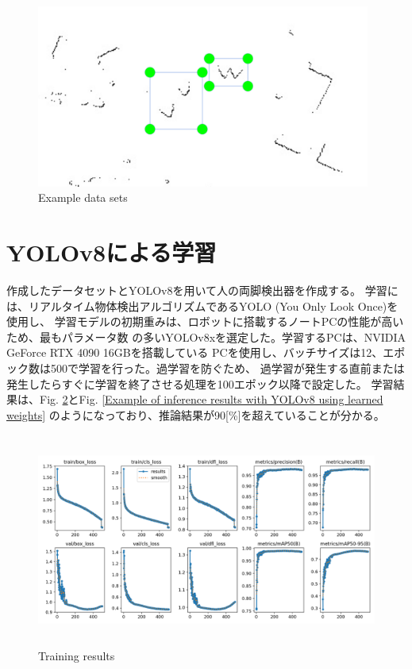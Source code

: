 \begin{figure}[h]
    \begin{center}
    \includegraphics[height=60mm,clip]{figure/Example-data-sets.png}
    \caption{Example data sets}
    \label{Example data sets}
    \end{center}
\end{figure}

\section{YOLOv8による学習}
作成したデータセットとYOLOv8を用いて人の両脚検出器を作成する。
学習には、リアルタイム物体検出アルゴリズムであるYOLO (You Only Look Once)を使用し、
学習モデルの初期重みは、ロボットに搭載するノートPCの性能が高いため、最もパラメータ数
の多いYOLOv8xを選定した。学習するPCは、NVIDIA GeForce RTX 4090 16GBを搭載している
PCを使用し、バッチサイズは12、エポック数は500で学習を行った。過学習を防ぐため、
過学習が発生する直前または発生したらすぐに学習を終了させる処理を100エポック以降で設定した。
学習結果は、Fig. \ref{Training results}とFig. \ref{Example of inference results with YOLOv8 using learned weights}
のようになっており、推論結果が90[\%]を超えていることが分かる。

\begin{figure}[h]
    \begin{center}
    \includegraphics[height=70mm,clip]{figure/yolov8-train-results.png}
    \caption{Training results}
    \label{Training results}
    \end{center}
\end{figure}


